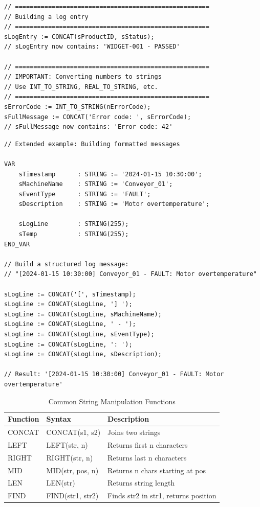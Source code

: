 \documentclass[11pt,a4paper]{article}
\begin{document}
\begin{lstlisting}
// =====================================================
// Building a log entry
// =====================================================
sLogEntry := CONCAT(sProductID, sStatus);
// sLogEntry now contains: 'WIDGET-001 - PASSED'

// =====================================================
// IMPORTANT: Converting numbers to strings
// Use INT_TO_STRING, REAL_TO_STRING, etc.
// =====================================================
sErrorCode := INT_TO_STRING(nErrorCode);
sFullMessage := CONCAT('Error code: ', sErrorCode);
// sFullMessage now contains: 'Error code: 42'
\end{lstlisting}

\begin{lstlisting}
// Extended example: Building formatted messages

VAR
    sTimestamp      : STRING := '2024-01-15 10:30:00';
    sMachineName    : STRING := 'Conveyor_01';
    sEventType      : STRING := 'FAULT';
    sDescription    : STRING := 'Motor overtemperature';
    
    sLogLine        : STRING(255);
    sTemp           : STRING(255);
END_VAR

// Build a structured log message:
// "[2024-01-15 10:30:00] Conveyor_01 - FAULT: Motor overtemperature"

sLogLine := CONCAT('[', sTimestamp);
sLogLine := CONCAT(sLogLine, '] ');
sLogLine := CONCAT(sLogLine, sMachineName);
sLogLine := CONCAT(sLogLine, ' - ');
sLogLine := CONCAT(sLogLine, sEventType);
sLogLine := CONCAT(sLogLine, ': ');
sLogLine := CONCAT(sLogLine, sDescription);

// Result: '[2024-01-15 10:30:00] Conveyor_01 - FAULT: Motor overtemperature'
\end{lstlisting}

\begin{table}[h]
\centering
\begin{tabular}{@{}llp{6cm}@{}}
\toprule
\textbf{Function} & \textbf{Syntax} & \textbf{Description} \\
\midrule
CONCAT & CONCAT(s1, s2) & Joins two strings \\
LEFT & LEFT(str, n) & Returns first n characters \\
RIGHT & RIGHT(str, n) & Returns last n characters \\
MID & MID(str, pos, n) & Returns n chars starting at pos \\
LEN & LEN(str) & Returns string length \\
FIND & FIND(str1, str2) & Finds str2 in str1, returns position \\
\bottomrule
\end{tabular}
\caption{Common String Manipulation Functions}
\end{table}
\end{document}
